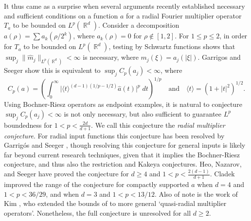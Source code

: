 \documentclass[11pt]{article}
\DeclareMathOperator{\RR}{\mathbb{R}}
\begin{document}
It thus came as a surprise when several arguments \cites{GarrigosSeeger,HeoNazarovSeeger,Cladek,KimQuasiradial} recently established necessary and sufficient conditions on a function $a$ for a radial Fourier multiplier operator $T_a$ to be bounded on $L^p(\RR^d)$.
Consider a decomposition $a(\rho) = \sum a_k( \rho / 2^k)$, where $a_k(\rho) = 0$ for $\rho \not \in [1,2]$. For $1 \leq p \leq 2$, in order for $T_a$ to be bounded on $L^p(\RR^d)$, testing by Schwartz functions shows that $\sup_j \| \widehat{m}_j \|_{L^p(\RR^d)} < \infty$ is necessary, where $m_j(\xi) = a_j(|\xi|)$. Garrigos and Seeger \cite{GarrigosSeeger} show this is equivalent to $\sup_j C_p(a_j) < \infty$, where
%
\[ C_p(a) = \left( \int_0^\infty \big| \langle t \rangle^{(d-1)(1/p - 1/2)} \widehat{a}(t) \big|^p\; dt \right)^{1/p} \quad\text{and}\quad \langle t \rangle = (1 + |t|^2)^{1/2}. \] %
%
Using Bochner-Riesz operators as endpoint examples, it is natural to conjecture $\sup_j C_p(a_j) < \infty$ is not only necessary, but also sufficient to guarantee $L^p$ boundedness for $1 < p < {\scriptstyle \frac{2d}{d+1}}$. We call this conjecture the \emph{radial multiplier conjecture}. For radial input functions this conjecture has been resolved by Garrig\'{o}s and Seeger \cite{GarrigosandSeeger}, though resolving this conjecture for general inputs is likely far beyond current research techniques, given that it implies the Bochner-Riesz conjecture, and thus also the restriction and Kakeya conjectures. Heo, Nazarov, and Seeger \cite{HeoNazarovSeeger} have proved the conjecture for $d \geq 4$ and $1 < p < {\scriptstyle \frac{2(d-1)}{d+1}}$. Cladek \cite{Cladek} improved the range of the conjecture for compactly supported $a$ when $d = 4$ and $1 < p < 36/29$, and when $d = 3$ and $1 < p < 13/12$. Also of note is the work of Kim \cite{KimQuasiradial}, who extended the bounds of \cite{HeoNazarovSeeger} to more general `quasi-radial multiplier operators'. Nonetheless, the full conjecture is unresolved for all $d \geq 2$. %
\end{document}
